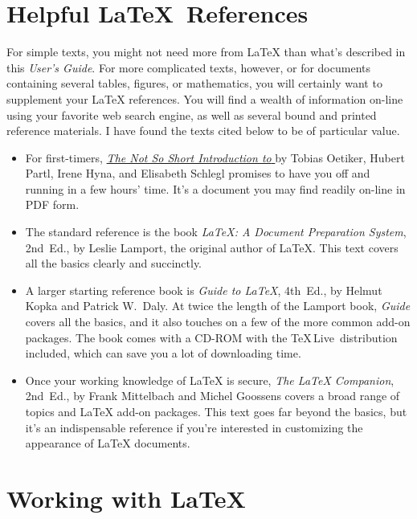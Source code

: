 \documentclass[11pt,letterpaper]{ltxdockit}[2011/03/25]
\newcommand*{\acro}[1]{{\small\textsc{#1}}}
\newcommand*{\booktitle}[1]{\textit{#1}}
\renewcommand{\-}{\discretionary{}{}{}}
\def\TeXLive{\TeX\,Live}
\begin{document}
\section{Helpful \LaTeX\ References}
\label{sec:references}

For simple texts, you might not need more from
\LaTeX{} than what's described in this
\booktitle{User's Guide}.  For more complicated texts, however, or for
documents containing several tables, figures, or mathematics, you will
certainly want to supplement your \LaTeX{} references.  You will find
a wealth of information on-line using your favorite web search engine,
as well as several bound and printed reference materials.  I have
found the texts cited below to be of particular value.
\begin{itemize}
\item
For first-timers,
\href{http://www.ctan.org/tex-archive/info/lshort/english/lshort-letter.pdf}%
{\booktitle{The Not So Short Introduction to \LaTeXe}}
by Tobias Oetiker, Hubert Partl, Irene Hyna, and Elisabeth Schlegl
promises to have you off and running in a few hours' time.  It's a
document you may find readily on-line in \acro{PDF} form.

\item
The standard reference is the book \booktitle{\LaTeX: A Document
  Preparation System}, 2nd~Ed., by Leslie Lamport, the original author
of \LaTeX{}.  This text covers all the basics clearly and succinctly.

\item
A larger starting reference book is \booktitle{Guide to \LaTeX},
4th~Ed., by Helmut Kopka and Patrick W.~Daly.  At twice the length of
the Lamport book, \booktitle{Guide} covers all the basics, and it also
touches on a few of the more common add-on packages.  The book
comes with a CD-ROM with the \TeXLive\ distribution included, which
can save you a lot of downloading time.

\item
Once your working knowledge of \LaTeX{} is secure, \booktitle{The
  \LaTeX{} Companion}, 2nd~Ed., by Frank Mittelbach and Michel
Goossens covers a broad range of topics and \LaTeX{} add-on packages.
This text goes far beyond the basics, but it's an indispensable
reference if you're interested in customizing the appearance of
\LaTeX{} documents.
\end{itemize}

\section{Working with \LaTeX}
\end{document}
